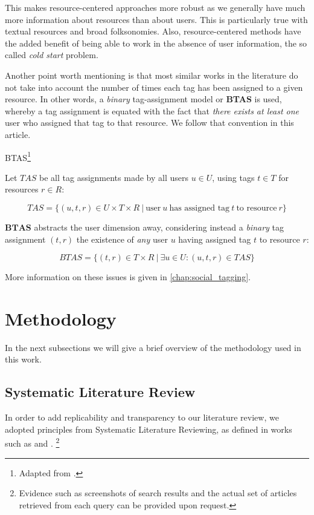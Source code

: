 This makes resource-centered approaches more robust as we generally have much more information about resources than about users. This is particularly true with textual resources and broad folksonomies. Also, resource-centered methods have the added benefit of being able to work in the absence of user information, the so called \textit{cold start} problem.

Another point worth mentioning is that most similar works in the literature do not take into account the number of times each tag has been assigned to a given resource. In other words, a \textit{binary} tag-assignment model or \textbf{BTAS} \citep{illig_etal_2011} is used, whereby a tag assignment is equated with the fact that \textit{there exists at least one} user who assigned that tag to that resource. We follow that convention in this article.

\begin{definition}{BTAS}\footnote{Adapted from \cite{illig_etal_2011}.}

Let $TAS$ be all tag assignments made by all users $u \in U$, using tags $t \in T$ for resources $r \in R$:

\[ TAS = \{ (u,t,r) \in  U \times T \times R \ | \ \text{user} \ u \ \text{has assigned tag} \ t \ \text{to resource} \ r \} \]  

$\mathbf{BTAS}$ abstracts the user dimension away, considering instead a \textit{binary} tag assignment $(t,r)$ the existence of \textit{any} user $u$ having assigned tag $t$ to resource $r$:

\[ BTAS = \{(t,r) \in T \times R \ | \ \exists u \in U : (u,t,r) \in TAS \}  \]

\end{definition}

More information on these issues is given in \autoref{chap:social_tagging}.

\section{Methodology}\label{section:intro_methodology}

In the next subsections we will give a brief overview of the methodology used in this work.

\subsection{Systematic Literature Review}\label{section:literature_review}

In order to add replicability and transparency to our literature review, we adopted principles from Systematic Literature Reviewing, as defined in works such as \cite{baumeister_leary_1997} and \cite{bem_1995}. \footnote{Evidence such as screenshots of search results and the actual set of articles retrieved from each query can be provided upon request.}

